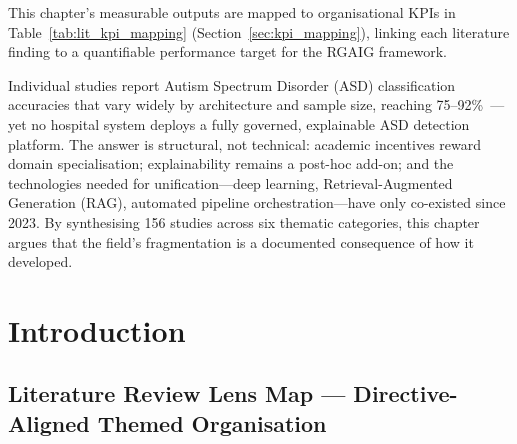 \noindent This chapter's measurable outputs are mapped to organisational KPIs in Table~\ref{tab:lit_kpi_mapping} (Section~\ref{sec:kpi_mapping}), linking each literature finding to a quantifiable performance target for the RGAIG framework.
\vspace{0.5em}

Individual studies report Autism Spectrum Disorder (ASD) classification accuracies that vary widely by architecture and sample size, reaching 75--92\%~\cite{heinsfeld2018identification}---yet no hospital system deploys a fully governed, explainable ASD detection platform. The answer is structural, not technical: academic incentives reward domain specialisation; explainability remains a post-hoc add-on; and the technologies needed for unification---deep learning, Retrieval-Augmented Generation (RAG), automated pipeline orchestration---have only co-existed since 2023. By synthesising 156 studies across six thematic categories, this chapter argues that the field's fragmentation is a documented consequence of how it developed.

\section{Introduction}

\subsection{Literature Review Lens Map --- Directive-Aligned Themed Organisation}
\label{sec:ch2_lit_review_lens_map}

